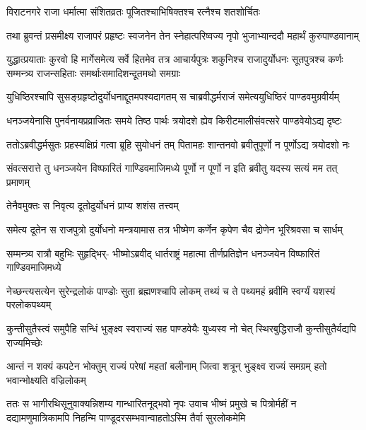 \twolineshloka
{विराटनगरे राजा धर्मात्मा संशितव्रतः}
{पूजितश्चाभिषिक्तश्च रत्नैश्च शतशोर्चितः}


\twolineshloka
{तथा ब्रुवन्तं प्रसमीक्ष्य राजापरं प्रहृष्टः स्वजनेन तेन}
{स्नेहात्परिष्वज्य नृपो भुजाभ्यान्ददौ महार्थं कुरुपाण्डवानाम्}


\threelineshloka
{युद्धात्प्रयाताः कुरवो हि मार्गेसमेत्य सर्वे हितमेव तत्र}
{आचार्यपुत्रः शकुनिश्च राजादुर्योधनः सूतपुत्रश्च कर्णः}
{सम्मन्त्र्य राजन्सहिताः समर्थाःसमादिशन्दूतमथो समग्राः}


\twolineshloka
{युधिष्ठिरश्चापि सुसङ्ग्रहृष्टोदुर्योधनाद्दूतमपश्यदागतम्}
{स चाब्रवीद्धर्मराजं समेत्ययुधिष्ठिरं पाण्डवमुग्रवीर्यम्}


\twolineshloka
{धनञ्जयेनासि पुनर्वनायप्रव्राजितः समये तिष्ठ पार्थः}
{त्रयोदशे ह्येव किरीटमालीसंवत्सरे पाण्डवेयोऽद्य दृष्टः}



\twolineshloka
{ततोऽब्रवीद्धर्मसुतः प्रहस्यक्षिप्रं गत्वा ब्रूहि सुयोधनं तम्}
{पितामहः शान्तनवो ब्रवीतुपूर्णो न पूर्णोऽद्य त्रयोदशो नः}


\fourlineindentedshloka
{संवत्सरात्ते तु धनञ्जयेन}
{विष्फारितं गाण्डिवमाजिमध्ये}
{पूर्णो न पूर्णो न इति ब्रवीतु}
{यदस्य सत्यं मम तत् प्रमाणम्}


\onelineshloka
{तेनैवमुक्तः स निवृत्य दूतोदुर्योधनं प्राप्य शशंस तत्त्वम्}

\fourlineindentedshloka
{समेत्य दूतेन स राजपुत्रो}
{दुर्योधनो मन्त्रयामास तत्र}
{भीष्मेण कर्णेन कृपेण चैव}
{द्रोणेन भूरिश्रवसा च सार्धम्}


\fourlineindentedshloka
{सम्मन्त्र्य रात्रौ बहुभिः सुहृद्भिर्-}
{भीष्मोऽब्रवीद् धार्तराष्ट्रं महात्मा}
{तीर्णप्रतिज्ञेन धनञ्जयेन}
{विष्फारितं गाण्डिवमाजिमध्ये}



\fourlineindentedshloka
{नेच्छन्त्यसत्येन सुरेन्द्रलोकं}
{पाण्डोः सुता ब्रह्मणश्चापि लोकम्}
{तथ्यं च ते पथ्यमहं ब्रवीमि}
{स्वर्ग्यं यशस्यं परलोकपथ्यम्}


\fourlineindentedshloka
{कुन्तीसुतैस्त्वं समुपैहि सन्धिं}
{भुङ्क्ष्व स्वराज्यं सह पाण्डवेयैः}
{युध्यस्व नो चेत् स्थिरबुद्धिराजौ}
{कुन्तीसुतैर्यद्यपि राज्यमिच्छेः}


\fourlineindentedshloka
{आन्तं न शक्यं कपटेन भोक्तुम्}
{राज्यं परेषां महतां बलीनाम्}
{जित्वा शत्रून् भुङ्क्ष्व राज्यं समग्रम्}
{हतो भवान्भोक्ष्यति वज्रिलोकम्}



\threelineshloka
{ततः स भागीरथिसूनुवाक्यन्निशम्य गान्धारितनूद्भवो नृपः}
{उवाच भीष्मं प्रमुखे च पित्रोर्महीं न दद्यामणुमात्रिकामपि}
{निहन्मि पाण्डूदरसम्भवान्वाहतोऽस्मि तैर्वा सुरलोकमेमि}


